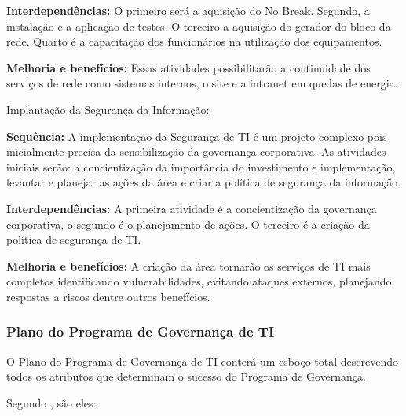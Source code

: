 \textbf{Interdependências:} O primeiro será a aquisição do No Break. Segundo, a instalação e a aplicação de testes. O terceiro a aquisição do gerador do bloco da rede. Quarto é a capacitação dos funcionários na utilização dos equipamentos.

\textbf{Melhoria e benefícios:} Essas atividades possibilitarão a continuidade dos serviços de rede como sistemas internos, o site e a intranet em quedas de energia.

Implantação da Segurança da Informação:

\textbf{Sequência:} A implementação da Segurança de TI é um projeto complexo pois inicialmente precisa da sensibilização da governança corporativa. As atividades iniciais serão: a concientização da importância do investimento e implementação, levantar e planejar as ações da área e criar a política de segurança da informação.

\textbf{Interdependências:} A primeira atividade é a concientização da governança corporativa, o segundo é o planejamento de ações. O terceiro é a criação da política de segurança de TI.

\textbf{Melhoria e benefícios:} A criação da área  tornarão os serviços de TI mais completos identificando vulnerabilidades, evitando ataques externos, planejando respostas a riscos dentre outros benefícios.

\subsubsection{Plano do Programa de Governança de TI}

O Plano do Programa de Governança de TI conterá um esboço total descrevendo todos os atributos que determinam o sucesso do Programa de Governança.

Segundo \cite{ImplantandoGTI:2012}, são eles:

